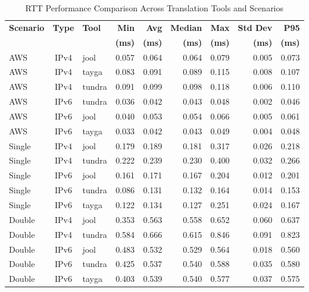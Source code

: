 \begin{table}[htbp]
\centering
\caption{RTT Performance Comparison Across Translation Tools and Scenarios}
\label{tab:rtt_comparison}
\footnotesize
\begin{tabular}{|l|c|l|r|r|r|r|r|r|}
\hline
\textbf{Scenario} & \textbf{Type} & \textbf{Tool} & \textbf{Min} & \textbf{Avg} & \textbf{Median} & \textbf{Max} & \textbf{Std Dev} & \textbf{P95}  \\
 & & & \textbf{(ms)} & \textbf{(ms)} & \textbf{(ms)} & \textbf{(ms)} & \textbf{(ms)} & \textbf{(ms)}  \\
\hline
AWS & IPv4 & jool & 0.057 & 0.064 & 0.064 & 0.079 & 0.005 & 0.073   \\
AWS & IPv4 & tayga & 0.083 & 0.091 & 0.089 & 0.115 & 0.008 & 0.107   \\
AWS & IPv4 & tundra & 0.091 & 0.099 & 0.098 & 0.118 & 0.006 & 0.110   \\
AWS & IPv6 & tundra & 0.036 & 0.042 & 0.043 & 0.048 & 0.002 & 0.046   \\
AWS & IPv6 & jool & 0.040 & 0.053 & 0.054 & 0.066 & 0.005 & 0.061   \\
AWS & IPv6 & tayga & 0.033 & 0.042 & 0.043 & 0.049 & 0.004 & 0.048   \\
\hline
Single & IPv4 & jool & 0.179 & 0.189 & 0.181 & 0.317 & 0.026 & 0.218   \\
Single & IPv4 & tundra & 0.222 & 0.239 & 0.230 & 0.400 & 0.032 & 0.266   \\
Single & IPv6 & jool & 0.161 & 0.171 & 0.167 & 0.204 & 0.012 & 0.201   \\
Single & IPv6 & tundra & 0.086 & 0.131 & 0.132 & 0.164 & 0.014 & 0.153   \\
Single & IPv6 & tayga & 0.122 & 0.134 & 0.127 & 0.251 & 0.024 & 0.167   \\
\hline
Double & IPv4 & jool & 0.353 & 0.563 & 0.558 & 0.652 & 0.060 & 0.637   \\
Double & IPv4 & tundra & 0.584 & 0.666 & 0.615 & 0.846 & 0.091 & 0.823   \\
Double & IPv6 & jool & 0.483 & 0.532 & 0.529 & 0.564 & 0.018 & 0.560   \\
Double & IPv6 & tundra & 0.425 & 0.537 & 0.540 & 0.588 & 0.035 & 0.580   \\
Double & IPv6 & tayga & 0.403 & 0.539 & 0.540 & 0.577 & 0.037 & 0.575   \\
\hline
\end{tabular}
\end{table}

